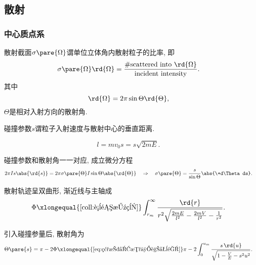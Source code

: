 \documentclass[../TheoreticalMechanics.tex]{subfiles}
\begin{document}


\subsection{散射} %
\label{sub:散射}

\subsubsection{中心质点系} %
\label{ssub:中心质点系}

\begin{definition}[散射截面]
    散射截面$\sigma\pare{\Omega}$谓单位立体角内散射粒子的比率, 即
    \[ \sigma\pare{\Omega}\rd{\Omega} = \frac{\mathrm{\#scattered\ into\ }\rd{\Omega}}{\mathrm{incident\ intensity}}. \]
    其中
    \[ \rd{\Omega} = 2\pi \sin\Theta \rd{\Theta}, \]
    $\Theta$是相对入射方向的散射角.
\end{definition}
\begin{definition}[碰撞参数]
    碰撞参数$s$谓粒子入射速度与散射中心的垂直距离.
\end{definition}
\begin{lemma}[碰撞参数与角动量]
    \begin{equation}
        \label{eq:碰撞参数与角动量}
        l = mv_0s = s\sqrt{2mE}.
    \end{equation}
\end{lemma}
\begin{lemma}[碰撞参数与散射角]
    碰撞参数和散射角一一对应, 成立微分方程
    \begin{equation}
        \label{eq:碰撞参数与散射角}
        2\pi I s\abs{\rd{s}} = 2\pi\sigma\pare{\Theta}I\sin\Theta\abs{\rd{\Theta}} \quad\Rightarrow\quad \sigma\pare{\Theta} = \frac{s}{\sin\Theta}\abs{\+d\Theta ds}.
    \end{equation}
\end{lemma}
\begin{lemma}[散射渐近线与主轴夹角]
    散射轨迹呈双曲形, 渐近线与主轴成
    \[ \Phi \xlongequal{\text{\cref{coll:轨道方程}}} \int_{r_m}^\infty \frac{\rd{r}}{r^2\sqrt{\frac{2mE}{l^2} - \frac{2mV}{l^2}-\frac{1}{r^2}}}.  \]
\end{lemma}
\begin{lemma}[散射角]
    引入碰撞参量后, 散射角为
    \[ \Theta\pare{s} = \pi - 2\Phi \xlongequal{\eqref{eq:碰撞参数与角动量}} \pi - 2 \int_0^{u_m} \frac{s\,\rd{u}}{\sqrt{1-\frac{V}{E} - s^2u^2}}. \]
\end{lemma}
\end{document}
